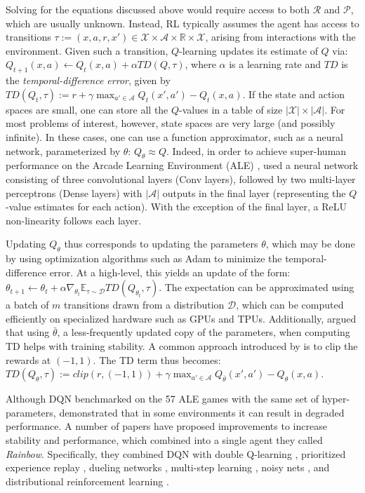 Solving for the equations discussed above would require access to both $\mathcal{R}$ and $\mathcal{P}$, which are usually unknown. Instead, RL typically assumes the agent has access to transitions $\tau := (x, a, r, x')\in\mathcal{X}\times\mathcal{A}\times\mathbb{R}\times\mathcal{X}$, arising from interactions with the environment. Given such a transition,  $Q$-learning \citep{Watkins1992qlearning} updates its estimate of $Q$ via: $Q_{t+1}(x, a) \leftarrow  Q_t(x, a) + {\alpha} TD(Q, \tau)$, where {$\alpha$} is a learning rate and $TD$ is the {\em temporal-difference error}, given by $TD(Q_t, \tau) := r + \gamma \max_{a' \in\mathcal{A}} Q_t(x', a') - Q_t(x, a)$. If the state and action spaces are small, one can store all the $Q$-values in a table of size $|\mathcal{X}|\times |\mathcal{A}|$. For most problems of interest, however, state spaces are very large (and possibly infinite). In these cases, one can use a function approximator, such as a neural network, parameterized by $\theta$: $Q_\theta\approx Q$. Indeed, in order to achieve super-human performance on the Arcade Learning Environment (ALE) \citep{bellemare2012ale}, \citet{mnih2015humanlevel} used a neural network consisting of three convolutional layers (Conv layers), followed by two multi-layer perceptrons (Dense layers) with $|\mathcal{A}|$ outputs in the final layer (representing the $Q$-value estimates for each action). With the exception of the final layer, a ReLU non-linearity follows each layer.

Updating $Q_{\theta}$ thus corresponds to updating the parameters $\theta$, which may be done by using optimization algorithms such as Adam \citep{kingma15adam} to minimize the temporal-difference error. At a high-level, this yields an update of the form: $\theta_{t+1} \leftarrow \theta_t + \alpha\nabla_{\theta_t} \mathbb{E}_{\tau\sim\mathcal{D}} TD(Q_{\theta_t}, \tau)$.
The expectation can be approximated using a batch of $m$ transitions drawn from a distribution $\mathcal{D}$, which can be computed efficiently on specialized hardware such as GPUs and TPUs. Additionally, \citet{mnih2015humanlevel} argued that using $\bar{\theta}$, a less-frequently updated copy of the parameters, when computing TD helps with training stability. A common approach introduced by \citet{mnih2015humanlevel} is to clip the rewards at $(-1, 1)$. The TD term thus becomes:
  $TD(Q_{\theta}, \tau) := clip(r, (-1, 1)) + \gamma\max_{a'\in\mathcal{A}}Q_{\bar{\theta}}(x', a') - Q_{\theta}(x, a)$.

Although DQN benchmarked on the 57 ALE games with the same set of hyper-parameters, \citet{anschel2017averageddqn} 
demonstrated that in some environments it can result in degraded performance.
A number of papers have proposed improvements to increase stability and performance, which \citet{Hessel2018RainbowCI} combined into a single agent they called \emph{Rainbow}. Specifically, they combined DQN with double Q-learning \citep{hasselt2015doubledqn}, prioritized experience replay \citep{Schaul2016PrioritizedER}, dueling networks \citep{wang16dueling}, multi-step learning \citep{sutton88learning}, noisy nets \citep{fortunato18noisy}, and distributional reinforcement learning \citep{Bellemare2017ADP}.

